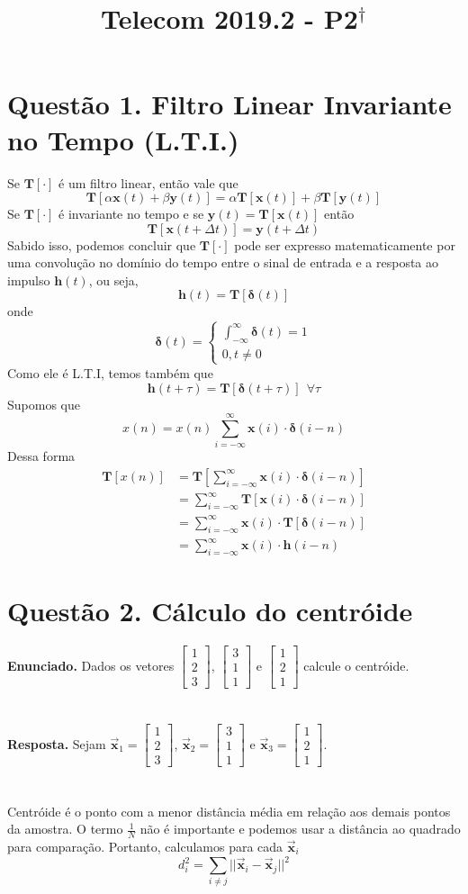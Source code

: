 \documentclass{article}
\title{Telecom 2019.2 - P2$^\dagger$}
\newcommand{\fil}[1]{\ensuremath{
	\mathbf{T}\left[#1\right]
}}
\newcommand{\infsum}[1]{\ensuremath{
	\sum_{#1=-\infty}^{\infty}
}}
\newcommand{\vect}[3]{\ensuremath{
	\left[\begin{matrix}
		#1\\#2\\#3
	\end{matrix}\right]
}}
\begin{document}
	\section*{Questão 1. {\small Filtro Linear Invariante no Tempo (L.T.I.)}}
	Se $\fil{\cdot}$ é um filtro linear, então vale que
		$$\fil{\alpha \mathbf{x}(t) + \beta \mathbf{y}(t)} = \alpha \fil{\mathbf{x}(t)} + \beta \fil{\mathbf{y}(t)}$$
	Se $\fil{\cdot}$ é invariante no tempo e se $\mathbf{y}(t) = \fil{\mathbf{x}(t)}$ então
		$$\fil{\mathbf{x}(t + \Delta t)} = \mathbf{y}(t + \Delta t)$$
	Sabido isso, podemos concluir que $\fil{\cdot}$ pode ser expresso matematicamente por uma convolução no domínio do tempo entre o sinal de entrada e a resposta ao impulso $\mathbf{h}(t)$, ou seja,
		$$\mathbf{h}(t) = \fil{\mathbf{\delta}(t)}$$
	onde
		$$\mathbf{\delta}(t) = 
		\begin{cases}
			\displaystyle \int_{-\infty}^{\infty} \mathbf{\delta}(t) = 1\\
			0, t \neq 0
		\end{cases}$$
	Como ele é L.T.I, temos também que
		$$\mathbf{h}(t + \tau) =  \fil{\mathbf{\delta}(t + \tau)} \ \ \forall \tau$$
	Supomos que 
		$$x(n) = x(n) \infsum{i} \mathbf{x}(i) \cdot \mathbf{\delta}(i - n)$$
	Dessa forma
		\begin{align*}
			\fil{x(n)}  &= \fil{\infsum{i} \mathbf{x}(i) \cdot \mathbf{\delta}(i - n)}\\
						&= \infsum{i} \fil{\mathbf{x}(i) \cdot \mathbf{\delta}(i - n)}\\
						&= \infsum{i} \mathbf{x}(i) \cdot \fil{\mathbf{\delta}(i - n)}\\
						&= \infsum{i} \mathbf{x}(i) \cdot \mathbf{h}(i - n)
		\end{align*}
		
	\section*{Questão 2. {\small Cálculo do centróide}}
	\textbf{Enunciado.} Dados os vetores $\vect{1}{2}{3}$, $\vect{3}{1}{1}$ e $\vect{1}{2}{1}$ calcule o centróide.
	~\\
	~\\
	~\\
	\textbf{Resposta.} Sejam $\vec{\mathbf{x}}_1 = \vect{1}{2}{3}$, $\vec{\mathbf{x}}_2 = \vect{3}{1}{1}$ e $\vec{\mathbf{x}}_3 = \vect{1}{2}{1}$.
	~\\
	~\\
	~\\
	Centróide é o ponto com a menor distância média em relação aos demais pontos da amostra. O termo $\frac{1}{N}$ não é importante e podemos usar a distância ao quadrado para comparação. Portanto, calculamos para cada $\vec{\mathbf{x}}_i$
		$$d_i^2 = \sum_{i \neq j} ||\vec{\mathbf{x}}_i - \vec{\mathbf{x}}_j||^2$$
	
\end{document}
